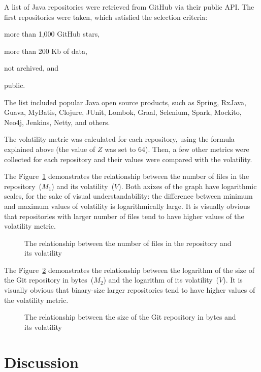 \documentclass[12pt]{article}
\begin{document}
A list of Java repositories were retrieved from GitHub via their
public API. The first \thetotalrepos{} repositories were taken, which satisfied
the selection criteria:
\begin{enumerate*}[label={\arabic*)}]
\item more than 1,000 GitHub stars,
\item more than 200 Kb of data,
\item not archived, and
\item public.
\end{enumerate*}
The list included popular Java open source products, such as
Spring, RxJava, Guava, MyBatis, Clojure, JUnit, Lombok,
Graal, Selenium, Spark, Mockito, Neo4j, Jenkins, Netty, and others.

The volatility metric was calculated for each repository, using the
formula explained above (the value of $Z$ was set to 64).
Then, a few other metrics were collected
for each repository and their values were compared with the volatility.

The Figure~\ref{fig:1} demonstrates the relationship between
the number of files in the repository~($M_1$) and its volatility~($V$). Both
axixes of the graph have logarithmic scales, for the sake of visual
understandability: the difference between minimum and maximum values
of volatility is logarithmically large. It is visually obvious that
repositories with larger number of files tend to have higher values
of the volatility metric.

\begin{figure}[h]
  
  \caption{The relationship between the number of files in the repository and its volatility}
  \label{fig:1}
\end{figure}

The Figure~\ref{fig:2} demonstrates the relationship between
the logarithm of the size of the Git repository in bytes~($M_2$) and
the logarithm of its volatility~($V$).
It is visually obvious that
binary-size larger repositories tend to have higher values
of the volatility metric.

\begin{figure}[h]
  
  \caption{The relationship between the size of the Git repository in bytes and its volatility}
  \label{fig:2}
\end{figure}

\section{Discussion}
\end{document}
